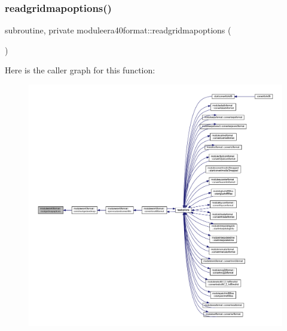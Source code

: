 \mbox{\label{namespacemoduleera40format_a4218771d6a94493f1954c06107f7ec1e}} 
\subsubsection{\texorpdfstring{readgridmapoptions()}{readgridmapoptions()}}
{\footnotesize\ttfamily subroutine, private moduleera40format\+::readgridmapoptions (\begin{DoxyParamCaption}{ }\end{DoxyParamCaption})\hspace{0.3cm}{\ttfamily [private]}}

Here is the caller graph for this function\+:\nopagebreak
\begin{figure}[H]
\begin{center}
\leavevmode
\includegraphics[width=350pt]{namespacemoduleera40format_a4218771d6a94493f1954c06107f7ec1e_icgraph}
\end{center}
\end{figure}
\mbox{\label{namespacemoduleera40format_a26224b66b1a9302c71025953c7303ed6}} 
